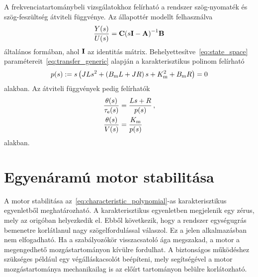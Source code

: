 A frekvenciatartománybeli vizsgálatokhoz felírható a rendszer 
szög-nyomaték és szög-feszültség átviteli függvénye. Az állapottér modellt felhasználva
\begin{align}\label{eq:transfer_generic}
    \frac{Y(s)}{U(s)} = \mathbf{C}{\left(s \mathbf{I} - \mathbf{A}\right)}^{-1} \mathbf{B}
\end{align}
általános formában, ahol $\mathbf{I}$ az identitás mátrix. Behelyettesítve~\eqref{eq:state_space} 
paramétereit~\eqref{eq:transfer_generic} alapján a karakterisztikus polinom felírható
\begin{align}\label{eq:characteristic_polynomial}
    p(s) := s\left(JLs^2 + \left(B_{\mathrm{m}} L + JR\right)s + K_{\mathrm{m}}^2 + B_{\mathrm{m}} R\right) = 0
\end{align}
alakban. Az átviteli függvények pedig felírhatók
\begin{equation}\label{eq:transfer_function}
    \begin{split}
        \frac{\theta(s)}{\tau_{\mathrm{e}}(s)} &= \frac{Ls + R}{p(s)}\,,\\
        \frac{\theta(s)}{V(s)} &= \frac{K_{\mathrm{m}}}{p(s)}
    \end{split}
\end{equation}
alakban.

\section{Egyenáramú motor stabilitása}
A motor stabilitása az~\eqref{eq:characteristic_polynomial}-as karakterisztikus egyenletből meghatározható.
A karakterisztikus egyenletben megjelenik egy zérus, mely az origóban helyezkedik el. Ebből következik, hogy a rendszer
egységugrás bemenetre korlátlanul nagy szögelfordulással válaszol. Ez a jelen alkalmazásban nem elfogadható. 
Ha a szabályozókör visszacsatoló ága megszakad, a motor a megengedhető mozgástartományon kívülre fordulhat.
A biztonságos működéshez szükséges például egy végálláskacsolót beépíteni, mely segítségével a motor 
mozgástartománya mechanikailag is az előírt tartományon belülre korlátozható.
